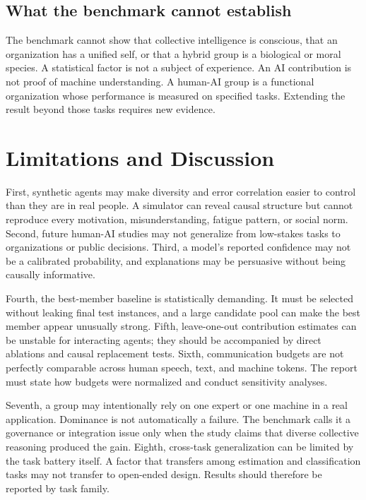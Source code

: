 \documentclass[conference]{IEEEtran}
\begin{document}
\subsection{What the benchmark cannot establish}

The benchmark cannot show that collective intelligence is conscious, that an organization has a unified self, or that a hybrid group is a biological or moral species. A statistical factor is not a subject of experience. An AI contribution is not proof of machine understanding. A human-AI group is a functional organization whose performance is measured on specified tasks. Extending the result beyond those tasks requires new evidence.

\section{Limitations and Discussion}

First, synthetic agents may make diversity and error correlation easier to control than they are in real people. A simulator can reveal causal structure but cannot reproduce every motivation, misunderstanding, fatigue pattern, or social norm. Second, future human-AI studies may not generalize from low-stakes tasks to organizations or public decisions. Third, a model's reported confidence may not be a calibrated probability, and explanations may be persuasive without being causally informative.

Fourth, the best-member baseline is statistically demanding. It must be selected without leaking final test instances, and a large candidate pool can make the best member appear unusually strong. Fifth, leave-one-out contribution estimates can be unstable for interacting agents; they should be accompanied by direct ablations and causal replacement tests. Sixth, communication budgets are not perfectly comparable across human speech, text, and machine tokens. The report must state how budgets were normalized and conduct sensitivity analyses.

Seventh, a group may intentionally rely on one expert or one machine in a real application. Dominance is not automatically a failure. The benchmark calls it a governance or integration issue only when the study claims that diverse collective reasoning produced the gain. Eighth, cross-task generalization can be limited by the task battery itself. A factor that transfers among estimation and classification tasks may not transfer to open-ended design. Results should therefore be reported by task family.
\end{document}
